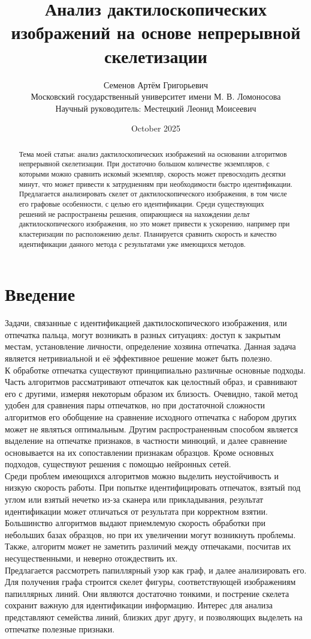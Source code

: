 \documentclass{article}
\title{Анализ дактилоскопических изображений на основе непрерывной скелетизации}
\author{ Семенов Артём Григорьевич\\
	Московский государственный университет имени М. В. Ломоносова \\
        Научный руководитель: Местецкий Леонид Моисеевич \\ }
\date{October 2025}
\begin{document}
\maketitle
\begin{abstract}
    Тема моей статьи: анализ дактилоскопических изображений на основании алгоритмов непрерывной скелетизации. При достаточно большом количестве экземпляров, с которыми можно сравнить искомый экземпляр, скорость может превосходить десятки минут, что может привести к затруднениям при необходимости быстро идентификации. Предлагается анализировать скелет от дактилоскопического изображения, в том числе его графовые особенности, с целью его идентификации. Среди существующих решений не распространены решения, опирающиеся на нахождении дельт дактилоскопического изображения, но это может привести к ускорению, например при кластеризации по расположению дельт. Планируется сравнить скорость и качество идентификации данного метода с результатами уже имеющихся методов.
\end{abstract}
\section{Введение}
Задачи, связанные с идентификацией дактилоскопического изображения, или отпечатка пальца, могут возникать в разных ситуациях: доступ к закрытым местам, установление личности, определение хозяина отпечатка. Данная задача является нетривиальной и её эффективное решение может быть полезно. \\
К обработке отпечатка существуют принципиально различные основные подходы. Часть алгоритмов рассматривают отпечаток как целостный образ, и сравнивают его с другими, измеряя некоторым образом их близость. Очевидно, такой метод удобен для сравнения пары отпечатков, но при достаточной сложности алгоритмов его обобщение на сравнение исходного отпечатка с набором других может не являться оптимальным. Другим распространенным способом является выделение на отпечатке признаков, в частности минюций, и далее сравнение основывается на их сопоставлении признакам образцов. Кроме основных подходов, существуют решения с помощью нейронных сетей. \\
Среди проблем имеющихся алгоритмов можно выделить неустойчивость и низкую скорость работы. При попытке идентифицировать отпечаток, взятый под углом или взятый нечетко из-за сканера или прикладывания, результат идентификации может отличаться от результата при корректном взятии. Большинство алгоритмов выдают приемлемую скорость обработки при небольших базах образцов, но при их увеличении могут возникнуть проблемы. Также, алгоритм может не заметить различий между отпечаками, посчитав их несущественными, и неверно отождествить их. \\
Предлагается рассмотреть папиллярный узор как граф, и далее анализировать его. Для получения графа строится скелет фигуры, соответствующей изображениям папиллярных линий. Они являются достаточно тонкими, и пострение скелета сохранит важную для идентификации информацию. Интерес для анализа представляют семейства линий, близких друг другу, и позволяющих выделеть на отпечатке полезные признаки.
\end{document}
